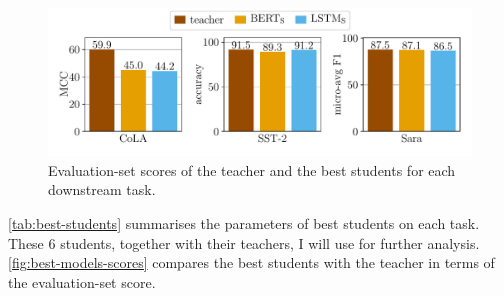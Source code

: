 \documentclass[bsc,frontabs,twoside,singlespacing,parskip,deptreport]{infthesis}
\begin{document}
{{    \begin{figure}[h!tb]
      \centering
      \includegraphics[width=13cm]{../experiments/analysis/img/best-models-scores.pdf}
      \caption{Evaluation-set scores of the teacher and the best students for each downstream task.}
      \label{fig:best-models-scores}
    \end{figure}

    \autoref{tab:best-students} summarises the parameters of best students on each task. These 6 students, together with their teachers, I will use for further analysis. \autoref{fig:best-models-scores} compares the best students with the teacher in terms of the evaluation-set score.
  }
}
\end{document}

